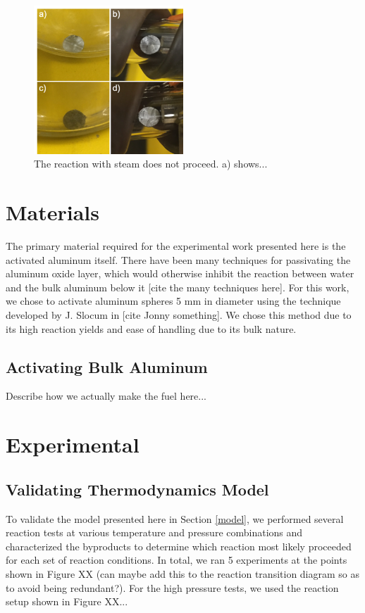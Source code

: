 \documentclass[preprint,12pt,3p]{elsarticle}
\begin{document}
\begin{figure}
  \centering
  \includegraphics[width=0.5\textwidth]{fig/steam_test_min}
  \caption{The reaction with steam does not proceed. a) shows...}
  \label{fig:steam_test}
\end{figure}

\section{Materials}
\label{materials}

The primary material required for the experimental work presented here is the
activated aluminum itself. There have been many techniques for passivating the
aluminum oxide layer, which would otherwise inhibit the reaction between water
and the bulk aluminum below it [cite the many techniques here]. For this work,
we chose to activate aluminum spheres 5 mm in diameter using the technique
developed by J. Slocum in [cite Jonny something]. We chose this method due to
its high reaction yields and ease of handling due to its bulk nature.

\subsection{Activating Bulk Aluminum}

Describe how we actually make the fuel here...

\section{Experimental}
\label{experimental}

\subsection{Validating Thermodynamics Model}

To validate the model presented here in Section \ref{model}, we performed
several reaction tests at various temperature and pressure combinations and
characterized the byproducts to determine which reaction most likely proceeded
for each set of reaction conditions. In total, we ran 5 experiments at the
points shown in Figure XX (can maybe add this to the reaction transition diagram
so as to avoid being redundant?). For the high pressure tests, we used the
reaction setup shown in Figure XX...
\end{document}
